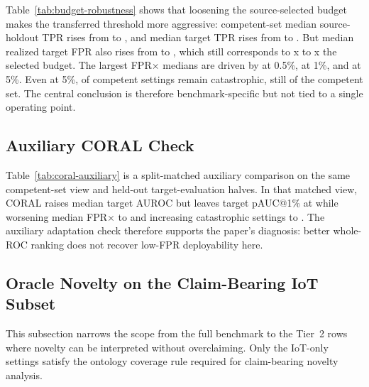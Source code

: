 \documentclass[preprint,12pt]{elsarticle}
\begin{document}
Table~\ref{tab:budget-robustness} shows that loosening the source-selected budget makes the transferred threshold more aggressive: competent-set median source-holdout TPR rises from \BudgetHalfPctCompetentMedianSourceTpr{} to \BudgetFivePctCompetentMedianSourceTpr{}, and median target TPR rises from \BudgetHalfPctCompetentMedianTargetTpr{} to \BudgetFivePctCompetentMedianTargetTpr{}. But median realized target FPR also rises from \BudgetHalfPctCompetentMedianTargetRealizedFpr{} to \BudgetFivePctCompetentMedianTargetRealizedFpr{}, which still corresponds to \BudgetHalfPctCompetentMedianBudgetMultiple{}x to \BudgetFivePctCompetentMedianBudgetMultiple{}x the selected budget. The largest FPR$\times$ medians are driven by \BudgetHalfPctCompetentDominantFprxDirection{} at 0.5\%, \BudgetOnePctCompetentDominantFprxDirection{} at 1\%, and \BudgetFivePctCompetentDominantFprxDirections{} at 5\%. Even at 5\%, \BudgetFivePctCompetentCatastrophicCount{} of \CompetentSettingCount{} competent settings remain catastrophic, still \BudgetFivePctCompetentCatastrophicShare{} of the competent set. The central conclusion is therefore benchmark-specific but not tied to a single operating point.

\subsection{Auxiliary CORAL Check}
\label{sec:coral-auxiliary}



Table~\ref{tab:coral-auxiliary} is a split-matched auxiliary comparison on the same competent-set view and held-out target-evaluation halves. In that matched view, CORAL raises median target AUROC but leaves target pAUC@1\% at \CoralCompetentMedianTargetPauc{} while worsening median FPR$\times$ to \CoralCompetentMedianBudgetMultiple{} and increasing catastrophic settings to \CoralCompetentCatastrophicCount{}. The auxiliary adaptation check therefore supports the paper's diagnosis: better whole-ROC ranking does not recover low-FPR deployability here.

\FloatBarrier

\subsection{Oracle Novelty on the Claim-Bearing IoT Subset}
\label{sec:oracle-novelty}

This subsection narrows the scope from the full benchmark to the Tier~2 rows where novelty can be interpreted without overclaiming. Only the \PrimaryIotSettingCount{} IoT-only settings satisfy the ontology coverage rule required for claim-bearing novelty analysis.
\end{document}
